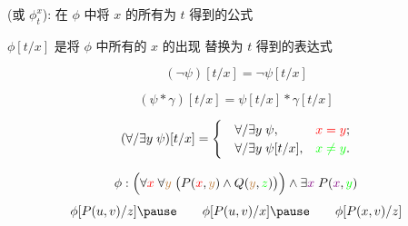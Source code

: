 \begin{frame}{}
  \begin{center}
    \violet{$\phi[t/x]$} (或 $\phi^{x}_{t}$):
      在 $\phi$ 中将 $x$ 的所有为 $t$ 得到的公式
  \end{center}

  \begin{definition}
    \begin{description}
      \setlength{\itemsep}{6pt}
      \item[$\phi$ 是原子公式:]
        $\phi[t/x]$ 是将 $\phi$ 中所有的 $x$ 的出现
        替换为 $t$ 得到的表达式
      \item[$\phi = \lnot\psi$:]
        \[
          (\lnot\psi)[t/x] = \lnot\psi[t/x]
        \]
      \item[$\phi = \psi \ast \gamma$:]
        \[
          (\psi \ast \gamma)[t/x] = \psi[t/x] \ast \gamma[t/x]
        \]
      \item[$\phi = \forall/\exists y\; \psi$:]
        \[
          (\forall/\exists y\; \psi)[t/x] =
          \begin{cases}
            \quad\forall/\exists y\; \psi, & \textcolor{red}{x = y}; \\
            \quad\forall/\exists y\; \psi[t/x], & \textcolor{green}{x \neq y}.
          \end{cases}
        \]
    \end{description}
  \end{definition}

  \pause
  \[
    \phi: \Big(\forall \textcolor{red}{x}\; \forall \textcolor{brown}{y}\; \big(P(\textcolor{red}{x}, \textcolor{brown}{y})
      \land Q(\textcolor{brown}{y}, \textcolor{green}{z})\big)\Big) \land
      \exists \textcolor{violet}{x}\; P(\textcolor{violet}{x}, \textcolor{green}{y})
  \]
  \pause
  \vspace{-0.30cm}
  \[
    \phi[P(u, v)/z] \pause\qquad
    \phi[P(u, v)/x] \pause\qquad
    \phi[P(x, v)/z]
  \]
\end{frame}

